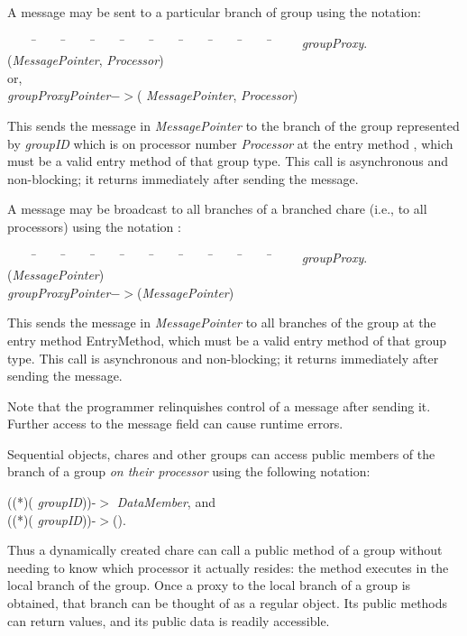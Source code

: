 A message may be sent to a particular branch of group using the
notation:

\begin{tabbing} ~~~~ \=~~~~ \=~~~~ \=~~~~ \=~~~~ \=~~~~ \=~~~~ \=~~~~ \=~~~~
\=~~~~ \kill \> {\it groupProxy}$.$({\it MessagePointer}, {\it
Processor}) \\ \> \> or, \\ \> {\it groupProxyPointer}$->$({\it
MessagePointer}, {\it Processor}) \end{tabbing}

This sends the message in {\it MessagePointer} to the branch of
the group represented by {\it groupID} which is on processor number {\it
Processor} at the entry method , which must be a valid entry
method of that group type. This call is asynchronous and non-blocking; it
returns immediately after sending the message.

A message may be broadcast  to all branches of a branched
chare (i.e., to all processors) using the notation :

\begin{tabbing} ~~~~ \=~~~~ \=~~~~ \=~~~~ \=~~~~ \=~~~~ \=~~~~ \=~~~~ \=~~~~
\=~~~~ \kill \> {\it groupProxy}$.$({\it MessagePointer}) \\ \>
{\it groupProxyPointer}$->$({\it MessagePointer}) \end{tabbing}

This sends the message in {\it MessagePointer} to all branches of the group at
the entry method {\sf EntryMethod}, which must be a valid entry method of that
group type. This call is asynchronous and non-blocking; it returns immediately
after sending the message.

Note that the programmer relinquishes control of a message after sending it.
Further access to the message field can cause runtime errors.


Sequential objects, chares and other groups can access public members of the
branch of a group  {\it on their processor} using
the following notation:

((*)( {\it groupID}))-$>${\it
DataMember}, and \\ ((*)( {\it
groupID}))-$>$().  

Thus a dynamically created chare can call a public method of a
group without needing to know which processor it actually resides: the method
executes in the local branch of the group.  Once a proxy to the local branch of a group is obtained, that branch can be thought of as a regular object.  Its public methods can return values, and its public data is readily accessible.   

